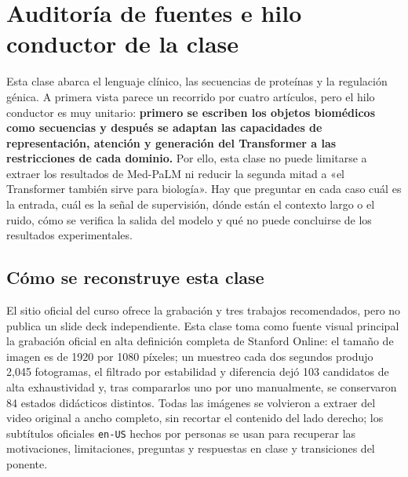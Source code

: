\documentclass[a4paper]{article}
\begin{document}
\makecscover

\section{Auditoría de fuentes e hilo conductor de la clase}

Esta clase abarca el lenguaje clínico, las secuencias de proteínas y la regulación génica. A primera vista parece un recorrido por cuatro artículos, pero el hilo conductor es muy unitario: \textbf{primero se escriben los objetos biomédicos como secuencias y después se adaptan las capacidades de representación, atención y generación del Transformer a las restricciones de cada dominio.} Por ello, esta clase no puede limitarse a extraer los resultados de Med-PaLM ni reducir la segunda mitad a «el Transformer también sirve para biología». Hay que preguntar en cada caso cuál es la entrada, cuál es la señal de supervisión, dónde están el contexto largo o el ruido, cómo se verifica la salida del modelo y qué no puede concluirse de los resultados experimentales.

\subsection{Cómo se reconstruye esta clase}

El sitio oficial del curso ofrece la grabación y tres trabajos recomendados, pero no publica un slide deck independiente. Esta clase toma como fuente visual principal la grabación oficial en alta definición completa de Stanford Online: el tamaño de imagen es de 1920 por 1080 píxeles; un muestreo cada dos segundos produjo 2,045 fotogramas, el filtrado por estabilidad y diferencia dejó 103 candidatos de alta exhaustividad y, tras compararlos uno por uno manualmente, se conservaron 84 estados didácticos distintos. Todas las imágenes se volvieron a extraer del video original a ancho completo, sin recortar el contenido del lado derecho; los subtítulos oficiales \texttt{en-US} hechos por personas se usan para recuperar las motivaciones, limitaciones, preguntas y respuestas en clase y transiciones del ponente.
\end{document}
